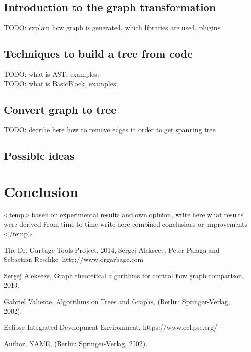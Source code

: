 \documentclass{report}
\begin{document}
\section{Introduction to the graph transformation}

TODO: explain how graph is generated, which libraries are used, plugins

\section{Techniques to build a tree from code}
TODO: what is AST, examples;
\\
TODO: what is BasicBlock, examples;

\section{Convert graph to tree}

TODO: decribe here how to remove edges in order to get spanning tree

\section{Possible ideas}



\chapter{Conclusion}
\label{cha:Conclusion}

<temp>
based on experimental results and own opinion, write here what results were derived 
From time to time write here combined conclusions or improvements
</temp>



\newpage
%
\begin{thebibliography}{100} %

 The Dr. Garbage Tools Project\textregistered \enspace, 2014, Sergej Alekseev, Peter Palaga and Sebastian Reschke,
http://www.drgarbage.com

  Sergej Alekseev, Graph theoretical algorithms for control flow graph comparison, 2013.
 
 Gabriel Valiente, Algorithms on Trees and Graphs,
(Berlin: Springer-Verlag, 2002).


 Eclipse Integrated Development Environment, https://www.eclipse.org/

 Author, NAME,
(Berlin: Springer-Verlag, 2002).

\end{thebibliography} 
\end{document}
